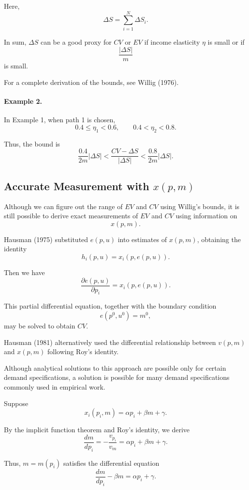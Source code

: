 Here,
\[
\Delta S
=
\sum_{i=1}^N \Delta S_i.
\]

In sum, \(\Delta S\) can be a good proxy for \(CV\) or \(EV\) if income elasticity \(\eta\) is small or if
\[
\frac{|\Delta S|}{m}
\]
is small.

For a complete derivation of the bounds, see Willig (1976).

\paragraph{Example 2.}
In Example 1, when path 1 is chosen,
\[
0.4\le \eta_1<0.6,
\qquad
0.4<\eta_2<0.8.
\]

Thus, the bound is
\[
\frac{0.4}{2m}|\Delta S|
<
\frac{CV-\Delta S}{|\Delta S|}
<
\frac{0.8}{2m}|\Delta S|.
\]

\subsection{Accurate Measurement with \(x(p,m)\)}

Although we can figure out the range of \(EV\) and \(CV\) using Willig's bounds, it is still possible to derive exact measurements of \(EV\) and \(CV\) using information on
\[
x(p,m).
\]

Hausman (1975) substituted \(e(p,u)\) into estimates of \(x(p,m)\), obtaining the identity
\[
h_i(p,u)
=
x_i(p,e(p,u)).
\]

Then we have
\[
\frac{\partial e(p,u)}{\partial p_i}
=
x_i(p,e(p,u)).
\]

This partial differential equation, together with the boundary condition
\[
e(p^0,u^0)=m^0,
\]
may be solved to obtain \(CV\).

Hausman (1981) alternatively used the differential relationship between \(v(p,m)\) and \(x(p,m)\) following Roy's identity.




Although analytical solutions to this approach are possible only for certain demand specifications, a solution is possible for many demand specifications commonly used in empirical work.

Suppose
\[
x_i(p_i,m)
=
\alpha p_i+\beta m+\gamma.
\]

By the implicit function theorem and Roy's identity, we derive
\[
\frac{dm}{dp_i}
=
-\frac{v_{p_i}}{v_m}
=
\alpha p_i+\beta m+\gamma.
\]

Thus, \(m=m(p_i)\) satisfies the differential equation
\[
\frac{dm}{dp_i}
-
\beta m
=
\alpha p_i+\gamma.
\]

